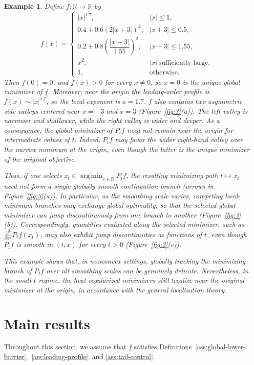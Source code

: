 \documentclass{article}
\newtheorem{example}[example]{Example}
\begin{document}
\begin{example}\label{ex:discontinuous_branch}
Define $f:\mathbb R\to\mathbb R$ by
$$
f(x)=
\begin{cases}
|x|^{1.7}, & |x|\le 1,\\
0.4+0.6(2|x+3|)^2, & |x+3|\le 0.5,\\
0.2+0.8\left(\dfrac{|x-3|}{1.55}\right)^2, & |x-3|\le 1.55,\\
x^2, & |x|\ \text{sufficiently large},\\
1, & \text{otherwise}.
\end{cases}
$$
Then $f(0)=0$, and $f(x)>0$ for every $x\neq 0$, so $x=0$ is the unique global minimizer of $f$. Moreover, near the origin the leading-order profile is $f(x)\sim |x|^{1.7}$, so the local exponent is $a=1.7$. $f$ also contains two asymmetric side valleys centered near $x=-3$ and $x=3$ (Figure~\ref{fig:3}(a)). The left valley is narrower and shallower, while the right valley is wider and deeper. As a consequence, the global minimizer of $P_t f$ need not remain near the origin for intermediate values of $t$. Indeed, $P_t f$ may favor the wider right-hand valley over the narrow minimum at the origin, even though the latter is the unique minimizer of the original objective.

Thus, if one selects $x_t\in \operatorname*{arg\,min}_{x\in\mathbb R} P_t f$, the resulting minimizing path $t\mapsto x_t$ need not form a single globally smooth continuation branch (arrows in Figure~\ref{fig:3}(a)). In particular, as the smoothing scale varies, competing local-minimum branches may exchange global optimality, so that the selected global minimizer can jump discontinuously from one branch to another (Figure~\ref{fig:3}(b)). Correspondingly, quantities evaluated along the selected minimizer, such as $\frac{\partial^2}{\partial x^2}P_{t}f(x_t)$, may also exhibit jump discontinuities as functions of $t$, even though $P_t f$ is smooth in $(t,x)$ for every $t>0$ (Figure~\ref{fig:3}(c)).

This example shows that, in nonconvex settings, globally tracking the minimizing branch of $P_t f$ over all smoothing scales can be genuinely delicate. Nevertheless, in the small-$t$ regime, the heat-regularized minimizers still localize near the original minimizer at the origin, in accordance with the general localization theory.
\end{example}

\section{Main results}
Throughout this section, we assume that $f$ satisfies Definitions~\ref{ass:global-lower-barrier},~\ref{ass:leading-profile}, and \ref{ass:tail-control}.
\end{document}
